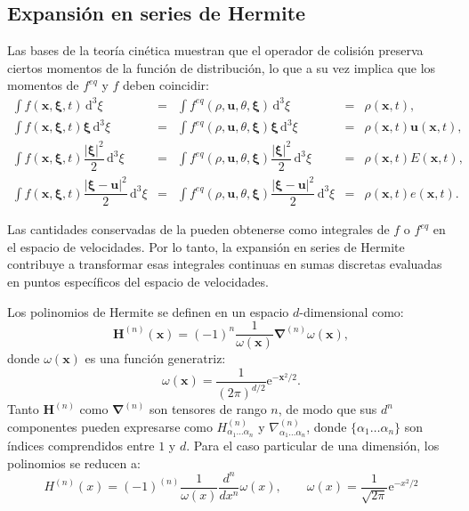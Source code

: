 \subsection{Expansi\'on en series de Hermite}
Las bases de la teor\'ia cin\'etica muestran que el operador de colisi\'on preserva ciertos momentos de la funci\'on de distribuci\'on, lo que a su vez implica que los momentos de $f^{eq}$ y $f$ deben coincidir:
\begin{subequations}
	\begin{align}
		\int f(\bm{x},\bm{\xi},t) \, \mbox{d}^3 \xi &=& \int f^{eq}(\rho, \bm{u},\theta,\bm{\xi}) \, \mbox{d}^3 \xi &=& \rho(\bm{x},t), \\
		\int f(\bm{x},\bm{\xi},t) \bm{\xi}\, \mbox{d}^3 \xi &=& \int f^{eq}(\rho, \bm{u},\theta,\bm{\xi}) \bm{\xi}\, \mbox{d}^3 \xi &=& \rho(\bm{x},t)\bm{u}(\bm{x},t), \\
		\int f(\bm{x},\bm{\xi},t) \dfrac{|\bm{\xi}|^2}{2} \, \mbox{d}^3 \xi &=& \int f^{eq}(\rho, \bm{u},\theta,\bm{\xi}) \dfrac{|\bm{\xi}|^2}{2} \, \mbox{d}^3 \xi &=& \rho(\bm{x},t)E(\bm{x},t), \\		
		\int f(\bm{x},\bm{\xi},t) \dfrac{|\bm{\xi}-\bm{u}|^2}{2} \, \mbox{d}^3 \xi &=& \int f^{eq}(\rho, \bm{u},\theta,\bm{\xi}) \dfrac{|\bm{\xi}-\bm{u}|^2}{2} \, \mbox{d}^3 \xi &=& \rho(\bm{x},t)e(\bm{x},t).
	\end{align}
	\label{eq:cons_moments}	
\end{subequations}

Las cantidades conservadas de la  pueden obtenerse como integrales de $f$ o $f^{eq}$ en el espacio de velocidades. Por lo tanto, la expansi\'on en series de Hermite contribuye a transformar esas integrales continuas en sumas discretas evaluadas en puntos espec\'ificos del espacio de velocidades.
\par
Los polinomios de Hermite se definen en un espacio $d$-dimensional como: \cite{shan_kinetic_2006,grad_kinetic_1949}
\begin{equation}
	\bm{H}^{(n)} (\bm{x})= (-1)^n\dfrac{1}{\omega (\bm{x})} \bm{\nabla}^{(n)}\omega(\bm{x}),
\end{equation}
donde $\omega(\bm{x})$ es una funci\'on generatriz:
\begin{equation}
	\omega(\bm{x}) = \dfrac{1}{(2\pi)^{d/2}}\mbox{e}^{-\bm{x}^2/2}.
\end{equation}
Tanto $\bm{H}^{(n)}$ como $\bm{\nabla}^{(n)}$ son tensores de rango $n$, de modo que sus $d^n$ componentes pueden expresarse como $H^{(n)}_{\alpha_1 \ldots \alpha_n}$ y $\nabla^{(n)}_{\alpha_1 \ldots \alpha_n}$, donde $\{\alpha_1 \ldots \alpha_n\}$ son \'indices comprendidos entre $1$ y $d$. Para el caso particular de una dimensi\'on, los polinomios se reducen a:
\begin{equation}
	H^{(n)}(x)=(-1)^{(n)} \dfrac{1}{\omega(x)} \dfrac{d^n}{dx^n}\omega(x), \qquad 
	\omega(x) = \dfrac{1}{\sqrt{2\pi}}\mbox{e}^{-x^2/2}
\end{equation}

